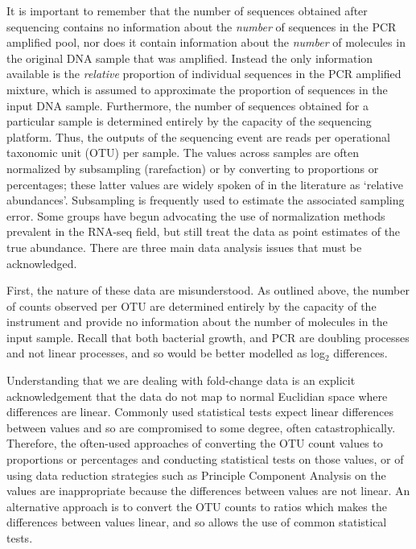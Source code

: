 \documentclass[11pt]{article}\usepackage[]{graphicx}\usepackage[]{color}
\begin{document}
It is important to remember that the number of sequences obtained after sequencing contains no information about the \emph{number} of sequences in the PCR amplified pool, nor does it contain information about the \emph{number}  of molecules in the original DNA sample that was amplified. Instead the only information available is the \emph{relative} proportion of individual sequences in the PCR amplified mixture, which is assumed to approximate the proportion of sequences in the input DNA sample. Furthermore, the number of sequences obtained for a particular sample is determined entirely by the capacity of the sequencing platform. Thus, the outputs of the sequencing event are reads per operational taxonomic unit (OTU) per sample. The values across samples are often normalized by subsampling (rarefaction) or by converting to proportions or percentages; these latter values are widely spoken of in the literature as `relative abundances'. Subsampling is frequently used to estimate the associated sampling error. Some groups have begun advocating the use of  normalization methods prevalent in the RNA-seq field\cite{McMurdie:2014a}, but still treat the data as point estimates of the true abundance. There are three main data analysis issues that must be acknowledged. 

First, the nature of these data are misunderstood. As outlined above, the number of counts observed  per OTU are determined entirely by the capacity of the instrument and provide no information about the number of molecules in the input sample. Recall that both bacterial growth, and PCR are doubling processes and not linear processes, and so would be better modelled as log$_2$ differences.

Understanding that we are dealing with fold-change data is an explicit acknowledgement that the data do not map to normal Euclidian space where differences are linear.  Commonly used statistical tests expect linear differences between values and so are compromised to some degree, often catastrophically\cite{Aitchison:1986,vandenBoogaart2008320}. Therefore, the often-used approaches of converting the OTU count values to proportions or percentages and conducting statistical tests on those values, or of using data reduction strategies such as Principle Component Analysis on the  values are inappropriate because the differences between values are not linear. An alternative approach is to convert the OTU counts to ratios\cite{Aitchison:1986,aitchison:2005,Pawlowsky-Glahn:2006,pawlowsky2011compositional} which makes the differences between values linear, and so allows the use of common statistical tests. 
\end{document}
